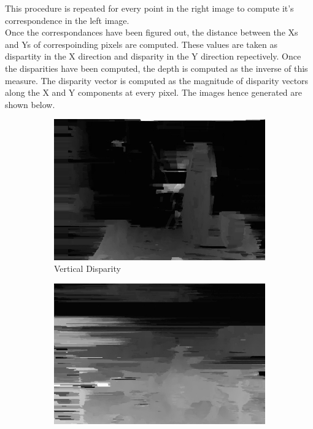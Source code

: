 \documentclass[letterpaper,11pt]{article}
\begin{document}
This procedure is repeated for every point in the right image to compute it's correspondence in the left image. \\

Once the correspondances have been figured out, the distance between the Xs and Ys of correspoinding pixels are computed. These values are taken as dispartity in the X direction and disparity in the Y direction repectively. Once the disparities have been computed, the depth is computed as the inverse of this measure. The disparity vector is computed as the magnitude of disparity vectors along the X and Y components at every pixel. The images hence generated are shown below. \\


\FloatBarrier
\begin{figure}[h]
\begin{subfigure}{.3\textwidth}
  \centering
  \includegraphics[width=.9\linewidth]{images/depthX.jpg}
  \caption{Vertical Disparity}
  \label{fig:sfig1}
\end{subfigure}%
\begin{subfigure}{.3\textwidth}
  \centering
  \includegraphics[width=.9\linewidth]{images/depthY.jpg}

\end{subfigure}
\end{figure}
\end{document}
